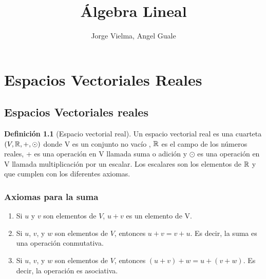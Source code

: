 \documentclass[10pt,a4paper]{amsbook}
\author{Jorge Vielma, Angel Guale}
\title{Álgebra Lineal}
\theoremstyle{definition}
\newtheorem{dfn}[theorem]{Definición}
\theoremstyle{remark}
\numberwithin{section}{chapter}
\numberwithin{equation}{chapter}
\begin{document}
\maketitle
\setcounter{page}{4}
\tableofcontents


\chapter{Espacios Vectoriales Reales}
\section{Espacios Vectoriales reales}

\begin{dfn}[Espacio vectorial real]
Un espacio vectorial real es una cuarteta $(V, \mathbb{R}, +, \odot)$ donde V es un conjunto no vacío , $\mathbb{R}$ es el campo de los números reales, + es una operación en V llamada suma o adición y $\odot$ es una operación en V llamada multiplicación por un escalar. Los escalares son los elementos de $\mathbb{R}$ y que cumplen con los diferentes axiomas.
\end{dfn}
\subsection*{Axiomas para la suma}
\begin{enumerate}
\item Si $u$ y $v$ son elementos de $V$, $u+v$ es un elemento de V.
\item Si $u$, $v$, y $w$ son elementos de $V$, entonces $u+v=v+u$. Es decir, la suma es una operación conmutativa.
\item Si $u$, $v$, y $w$ son elementos de $V$, entonces  $(u+v)+w=u+(v+w)$. Es decir, la operación es asociativa.
\end{enumerate}
\end{document}
